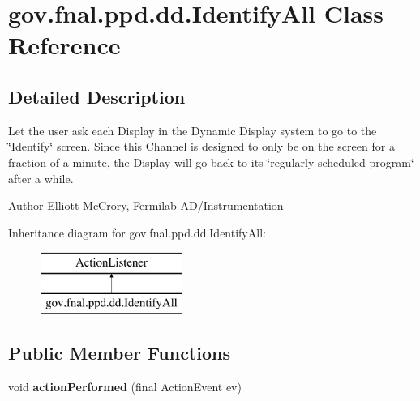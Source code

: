 \hypertarget{classgov_1_1fnal_1_1ppd_1_1dd_1_1IdentifyAll}{\section{gov.\-fnal.\-ppd.\-dd.\-Identify\-All Class Reference}
\label{classgov_1_1fnal_1_1ppd_1_1dd_1_1IdentifyAll}
}


\subsection{Detailed Description}
Let the user ask each Display in the Dynamic Display system to go to the \char`\"{}\-Identify\char`\"{} screen. Since this Channel is designed to only be on the screen for a fraction of a minute, the Display will go back to its \char`\"{}regularly scheduled program\char`\"{} after a while.

\begin{DoxyAuthor}{Author}
Elliott Mc\-Crory, Fermilab A\-D/\-Instrumentation 
\end{DoxyAuthor}
Inheritance diagram for gov.\-fnal.\-ppd.\-dd.\-Identify\-All\-:\begin{figure}[H]
\begin{center}
\leavevmode
\includegraphics[height=2.000000cm]{classgov_1_1fnal_1_1ppd_1_1dd_1_1IdentifyAll}
\end{center}
\end{figure}
\subsection*{Public Member Functions}
\begin{DoxyCompactItemize}
\item 
\hypertarget{classgov_1_1fnal_1_1ppd_1_1dd_1_1IdentifyAll_aaa98b5c9c84be6044758b7646b45c544}{void {\bfseries action\-Performed} (final Action\-Event ev)}\label{classgov_1_1fnal_1_1ppd_1_1dd_1_1IdentifyAll_aaa98b5c9c84be6044758b7646b45c544}

\end{DoxyCompactItemize}
